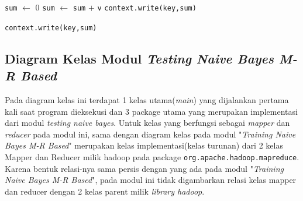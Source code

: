 \begin{enumerate}
\begin{algorithm}[H]
\begin{algorithmic}[1]
	\State \texttt{sum} $\gets$ 0
		\State \texttt{sum} $\gets$ \texttt{sum} $+$ \texttt{v}
	\EndFor
	\State \texttt{context.write(key,sum)}
	
		\State \texttt{context.write(key,sum)}
	\EndFor
\EndIf

\EndProcedure
\end{algorithmic}
\end{algorithm}


\end{enumerate}

\subsection{Diagram Kelas Modul \textit{Testing Naive Bayes M-R Based}}
Pada diagram kelas ini terdapat 1 kelas utama(\textit{main}) yang dijalankan pertama kali saat program dieksekusi dan 3 package utama yang merupakan implementasi dari modul \textit{testing naive bayes}. Untuk kelas yang berfungsi sebagai \textit{mapper} dan \textit{reducer} pada modul ini, sama dengan diagram kelas pada modul "\textit{Training Naive Bayes M-R Based}" merupakan kelas implementasi(kelas turunan) dari 2 kelas Mapper dan Reducer milik hadoop pada package \verb|org.apache.hadoop.mapreduce|. Karena bentuk relasi-nya sama persis dengan yang ada pada modul "\textit{Training Naive Bayes M-R Based}", pada modul ini tidak digambarkan relasi kelas mapper dan reducer dengan 2 kelas parent milik \textit{library hadoop}.

